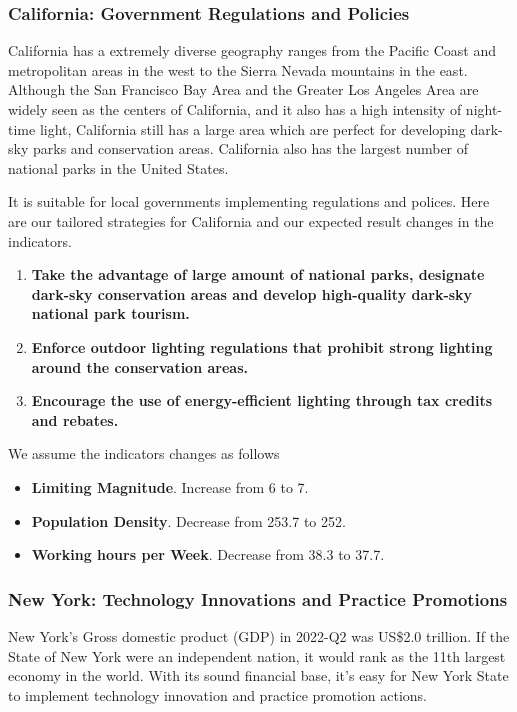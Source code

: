 \subsubsection{California: Government Regulations and Policies}
California has a extremely diverse geography ranges from the Pacific Coast and metropolitan areas in the west to the Sierra Nevada mountains in the east. Although the San Francisco Bay Area and the Greater Los Angeles Area are widely seen as the centers of California, and it also has a high intensity of night-time light, California still has a large area which are perfect for developing dark-sky parks and conservation areas. California also has the largest number of national parks in the United States.

It is suitable for local governments implementing regulations and polices. Here are our tailored strategies for California and our expected result changes in the indicators.

\begin{enumerate}
    \item \textbf{Take the advantage of large amount of national parks, designate dark-sky conservation areas and develop high-quality dark-sky national park tourism.} 

    \item \textbf{Enforce outdoor lighting regulations that prohibit strong lighting around the conservation areas.}
    
    \item \textbf{Encourage the use of energy-efficient lighting through tax credits and rebates.}

\end{enumerate}

We assume the indicators changes as follows
\begin{itemize}
    \item \textbf{Limiting Magnitude}. Increase from 6 to 7.
    \item \textbf{Population Density}. Decrease from 253.7 to 252.
    \item \textbf{Working hours per Week}. Decrease from 38.3 to 37.7.
\end{itemize}

\subsubsection{New York: Technology Innovations and Practice Promotions}

New York's Gross domestic product (GDP) in 2022-Q2 was US\$2.0 trillion. If the State of New York were an independent nation, it would rank as the 11th largest economy in the world. With its sound financial base, it's easy for New York State to implement technology innovation and practice promotion actions.

